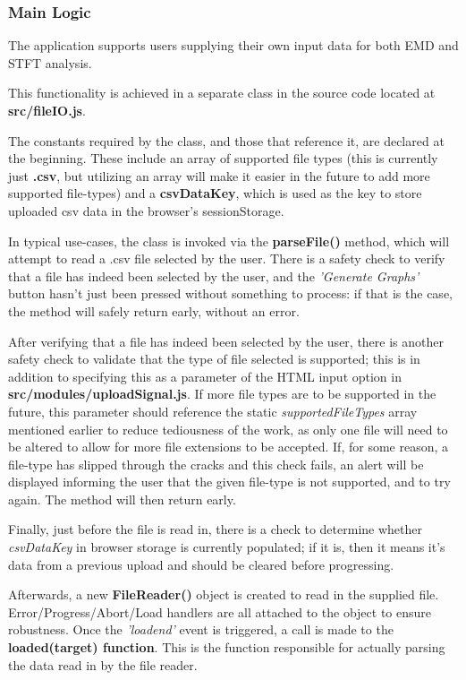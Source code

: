 \subsubsection{Main Logic}
The application supports users supplying their own input data for both EMD and STFT analysis. 

This functionality is achieved in a separate class in the source code located at {\bf src/fileIO.js}. 

The constants required by the class, and those that reference it, are declared at the beginning. These include an array of supported file types (this is currently just {\bf .csv}, but utilizing an array will make it easier in the future to add more supported file-types) and a {\bf csvDataKey}, which is used as the key to store uploaded csv data in the browser's sessionStorage.

In typical use-cases, the class is invoked via the {\bf parseFile()} method, which will attempt to read a .csv file selected by the user. There is a safety check to verify that a file has indeed been selected by the user, and the {\it 'Generate Graphs'} button hasn't just been pressed without something to process: if that is the case, the method will safely return early, without an error.

After verifying that a file has indeed been selected by the user, there is another safety check to validate that the type of file selected is supported; this is in addition to specifying this as a parameter of the HTML input option in {\bf src/modules/uploadSignal.js}. If more file types are to be supported in the future, this parameter should reference the static {\it supportedFileTypes} array mentioned earlier to reduce tediousness of the work, as only one file will need to be altered to allow for more file extensions to be accepted.
If, for some reason, a file-type has slipped through the cracks and this check fails, an alert will be displayed informing the user that the given file-type is not supported, and to try again. The method will then return early.

Finally, just before the file is read in, there is a check to determine whether {\it csvDataKey} in browser storage is currently populated; if it is, then it means it's data from a previous upload and should be cleared before progressing. 

Afterwards, a new {\bf FileReader()} object is created to read in the supplied file. Error/Progress/Abort/Load handlers are all attached to the object to ensure robustness. Once the {\it 'loadend'} event is triggered, a call is made to the {\bf loaded(target) function}. This is the function responsible for actually parsing the data read in by the file reader.

